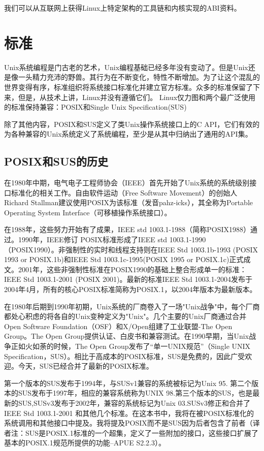我们可以从互联网上获得Linux上特定架构的工具链和内核实现的ABI资料。 

\section{标准}
Unix系统编程是门古老的艺术，Unix编程基础已经多年没有变动了。但是Unix还是像一头精力充沛的野兽。其行为在不断变化，特性不断增加。为了让这个混乱的世界变得有序，标准组织将系统接口标准化并建立官方标准。众多的标准保留了下来，但是，从技术上讲，Linux并没有遵循它们。 Linux仅力图和两个最广泛使用的标准保持兼容：POSIX和Single Unix Specification(SUS)

除了其他内容，POSIX和SUS定义了类Unix操作系统接口上的C API，它们有效的为各种兼容的Unix系统定义了系统编程，至少是从其中归纳出了通用的API集。

\subsection{POSIX和SUS的历史}
在1980年中期，电气电子工程师协会（IEEE）首先开始了Unix系统的系统级别接口标准化的相关工作。自由软件运动（Free Software Movement）的创始人Richard Stallman建议使用POSIX为该标准（发音pahz-icks），其全称为Portable Operating System Interface（可移植操作系统接口）。

在1988年，这些努力开始有了成果，IEEE std 1003.1-1988（简称POSIX1988）通过。1990年，IEEE修订 POSIX标准形成了IEEE std 1003.1-1990（POSIX1990）。非强制性的实时和线程支持则在IEEE Std 1003.1b-1993 (POSIX 1993 or POSIX.1b)和IEEE Std 1003.1c-1995(POSIX 1995 or POSIX.1c)正式成文。2001年，这些非强制性标准在POSIX1990的基础上整合形成单一的标准：IEEE Std 1003.1-2001 (POSIX 2001)。最新的标准IEEE Std 1003.1-2004发布于2004年4月，所有的核心POSIX标准简称为POSIX.1，以2004年版本为最新版本。

在1980年后期到1990年初期，Unix系统的厂商卷入了一场"Unix战争"中，每个厂商都处心积虑的将各自的Unix变种定义为"Unix"。几个主要的Unix厂商通过合并Open Software Foundation（OSF）和X/Open组建了工业联盟-The Open Group。The Open Group提供认证、白皮书和兼容测试。在1990早期，当Unix战争正如火如荼的时候，The Open Group发布了“单一UNIX规范”（Single UNIX Specification，SUS）。相比于高成本的POSIX标准，SUS是免费的，因此广受欢迎。今天，SUS已经合并了最新的POSIX标准。

第一个版本的SUS发布于1994年，与SUSv1兼容的系统被标记为Unix 95. 第二个版本的SUS发布于1997年，相应的兼容系统称为UNIX 98.第三个版本的SUS，也是最新的SUS,SUSv3发布于2002年，兼容的系统标记为Unix 03.SUSv3修正和合并了IEEE Std 1003.1-2001 和其他几个标准。在这本书中，我将在被POSIX标准化的系统调用和其他接口中提及。我将提及POSIX而不是SUS因为后者包含了前者（译者注：SUS是POSIX.1标准的一个超集，定义了一些附加的接口，这些接口扩展了基本的POSIX.1规范所提供的功能--APUE S2.2.3）。 

